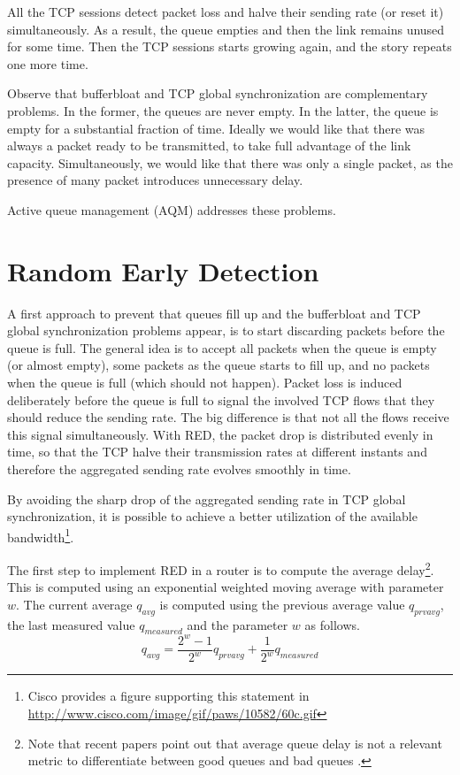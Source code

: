 All the TCP sessions detect packet loss and halve their sending rate (or reset it) simultaneously.
As a result, the queue empties and then the link remains unused for some time.
Then the TCP sessions starts growing again, and the story repeats one more time.

Observe that bufferbloat and TCP global synchronization are complementary problems.
In the former, the queues are never empty.
In the latter, the queue is empty for a substantial fraction of time.
Ideally we would like that there was always a packet ready to be transmitted, to take full advantage of the link capacity.
Simultaneously, we would like that there was only a single packet, as the presence of many packet introduces unnecessary delay.

Active queue management (AQM) addresses these problems.

\section{Random Early Detection}

A first approach to prevent that queues fill up and the bufferbloat and TCP global synchronization problems appear, is to start discarding packets before the queue is full.
The general idea is to accept all packets when the queue is empty (or almost empty), some packets as the queue starts to fill up, and no packets when the queue is full (which should not happen).
Packet loss is induced deliberately before the queue is full to signal the involved TCP flows that they should reduce the sending rate.
The big difference is that not all the flows receive this signal simultaneously.
With RED, the packet drop is distributed evenly in time, so that the TCP halve their transmission rates at different instants and therefore the aggregated sending rate evolves smoothly in time.

By avoiding the sharp drop of the aggregated sending rate in TCP global synchronization, it is possible to achieve a better utilization of the available bandwidth\footnote{Cisco provides a figure supporting this statement in \url{http://www.cisco.com/image/gif/paws/10582/60c.gif}}.


The first step to implement RED in a router is to compute the average delay\footnote{Note that recent papers point out that average queue delay is not a relevant metric to differentiate between good queues and bad queues \cite{nichols2012cqd}.}.
This is computed using an exponential weighted moving average with parameter $w$.
The current average $q_{avg}$ is computed using the previous average value $q_{prvavg}$, the last measured value $q_{measured}$ and the parameter $w$ as follows.
\begin{equation}
q_{avg} = \frac{2^w-1}{2^w}q_{prvavg} + \frac{1}{2^w}q_{measured}
\end{equation}

